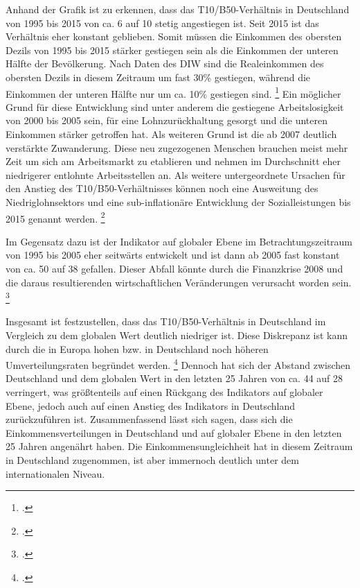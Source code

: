 Anhand der Grafik ist zu erkennen, dass das T10/B50-Verhältnis in Deutschland von 1995 bis 2015 von ca. 6 auf 10 stetig angestiegen ist.  Seit 2015 ist das Verhältnis eher konstant geblieben. Somit müssen die Einkommen des obersten Dezils von 1995 bis 2015 stärker gestiegen sein als die Einkommen der unteren Hälfte der Bevölkerung. Nach Daten des DIW sind die Realeinkommen des obersten Dezils in diesem Zeitraum um fast 30\% gestiegen, während die Einkommen der unteren Hälfte nur um ca. 10\% gestiegen sind. \footcite[Vgl.][S. 452]{grabka_einkommensverteilung_2018} Ein möglicher Grund für diese Entwicklung sind unter anderem die gestiegene Arbeitslosigkeit von 2000 bis 2005 sein, für eine Lohnzurückhaltung gesorgt und die unteren Einkommen stärker getroffen hat. Als weiteren Grund ist die ab 2007 deutlich verstärkte Zuwanderung. Diese neu zugezogenen Menschen brauchen meist mehr Zeit um sich am Arbeitsmarkt zu etablieren und nehmen im Durchschnitt eher niedrigerer entlohnte Arbeitsstellen an. Als weitere untergeordnete Ursachen für den Anstieg des T10/B50-Verhältnisses können noch eine Ausweitung des Niedriglohnsektors und eine sub-inflationäre Entwicklung der Sozialleistungen bis 2015 genannt werden. \footcite[Vgl.][S. 453f]{grabka_einkommensverteilung_2018}

Im Gegensatz dazu ist der Indikator auf globaler Ebene im Betrachtungszeitraum von 1995 bis 2005 eher seitwärts entwickelt und ist dann ab 2005 fast konstant von ca. 50 auf 38 gefallen. Dieser Abfall könnte durch die Finanzkrise 2008 und die daraus resultierenden wirtschaftlichen Veränderungen verursacht worden sein. \footcite[Vgl.][S. 55]{wir_2022}

Insgesamt ist festzustellen, dass das T10/B50-Verhältnis in Deutschland im Vergleich zu dem globalen Wert deutlich niedriger ist. Diese Diskrepanz ist kann durch die in Europa hohen bzw. in Deutschland noch höheren Umverteilungsraten begründet werden. \footcite[Vgl.][S. 36f]{wir_2022} Dennoch hat sich der Abstand zwischen Deutschland und dem globalen Wert in den letzten 25 Jahren von ca. 44 auf 28 verringert, was grö{\ss}tenteils auf einen Rückgang des Indikators auf globaler Ebene, jedoch auch auf einen Anstieg des Indikators in Deutschland zurückzuführen ist. Zusammenfassend lässt sich sagen, dass sich die Einkommensverteilungen in Deutschland und auf globaler Ebene in den letzten 25 Jahren angenährt haben. Die Einkommensungleichheit hat in diesem Zeitraum in Deutschland zugenommen, ist aber immernoch deutlich unter dem internationalen Niveau.

